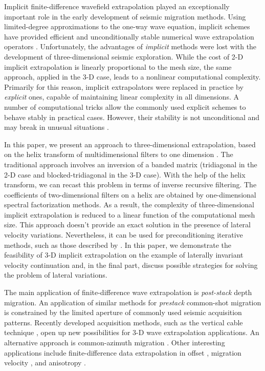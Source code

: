 Implicit finite-difference wavefield extrapolation played an
exceptionally important role in the early development of seismic
migration methods. Using limited-degree approximations to the one-way
wave equation, implicit schemes have provided efficient and
unconditionally stable numerical wave extrapolation operators
\cite[]{Godfrey.sep.16.83,Claerbout.blackwell.85}. Unfortunately, the
advantages of \emph{implicit} methods were lost with the development
of three-dimensional seismic exploration. While the cost of 2-D
implicit extrapolation is linearly proportional to the mesh size, the
same approach, applied in the 3-D case, leads to a nonlinear
computational complexity. Primarily for this reason, implicit
extrapolators were replaced in practice by \emph{explicit} ones,
capable of maintaining linear complexity in all dimensions. A number
of computational tricks \cite[]{GEO56-11-17701777} allow the commonly
used explicit schemes to behave stably in practical cases.  However,
their stability is not unconditional and may break in unusual
situations \cite[]{SEG-1994-1266}.
\par
In this paper, we present an approach to three-dimensional
extrapolation, based on the helix transform of multidimensional
filters to one dimension \cite[]{Claerbout.gem.97}. The traditional
approach involves an inversion of a banded matrix (tridiagonal in the
2-D case and blocked-tridiagonal in the 3-D case). With the help of
the helix transform, we can recast this problem in terms of inverse
recursive filtering.  The coefficients of two-dimensional filters on a
helix are obtained by one-dimensional spectral factorization methods.
As a result, the complexity of three-dimensional implicit
extrapolation is reduced to a linear function of the computational
mesh size. This approach doesn't provide an exact solution in the
presence of lateral velocity variations. Nevertheless, it can be used
for preconditioning iterative methods, such as those described by
\cite{Nichols.sep.70.31}.  In this paper, we demonstrate the
feasibility of 3-D implicit extrapolation on the example of laterally
invariant velocity continuation and, in the final part, discuss
possible strategies for solving the problem of lateral variations.
\par
The main application of finite-difference wave extrapolation is
\emph{post-stack} depth migration. An application of similar methods
for \emph{prestack} common-shot migration is constrained by the
limited aperture of commonly used seismic acquisition patterns.
Recently developed acquisition methods, such as the vertical cable
technique \cite[]{SEG-1993-1376}, open up new possibilities for 3-D wave
extrapolation applications. An alternative approach is common-azimuth
migration \cite[]{Biondi.sep.80.109,Biondi.sep.93.1}. Other interesting
applications include finite-difference data extrapolation in offset
\cite[]{Fomel.sep.84.179}, migration velocity \cite[]{Fomel.sep.92.159},
and anisotropy \cite[]{Alkhalifah.sep.94.tariq3}.

